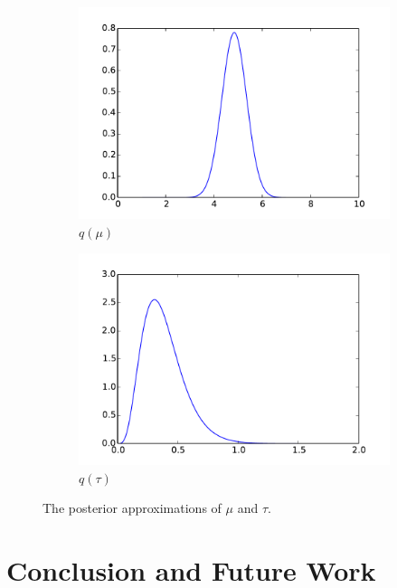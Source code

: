 \documentclass[twoside,11pt]{article}
\begin{document}
\begin{figure}
  \begin{center}
    \begin{subfigure}[b]{0.4\textwidth}
      \includegraphics[width=\textwidth]{fig_mu}
      \caption{$q(\mu)$}
    \end{subfigure}
    \begin{subfigure}[b]{0.4\textwidth}
      \includegraphics[width=\textwidth]{fig_tau}
      \caption{$q(\tau)$}
    \end{subfigure}
  \end{center}
  \caption{The posterior approximations of $\mu$ and $\tau$.}
  \label{fig:posterior}
\end{figure}

\section{Conclusion and Future Work}
\end{document}
